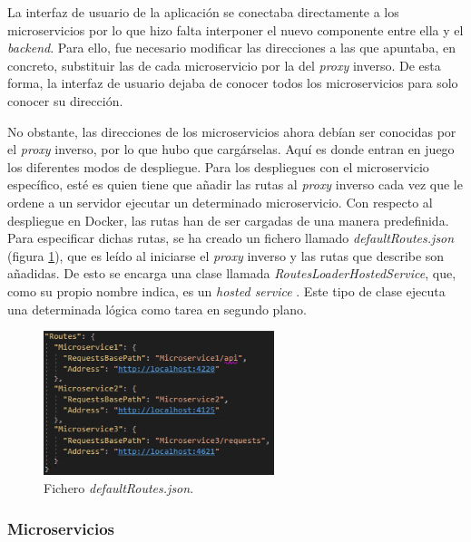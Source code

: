 \documentclass[11pt,spanish,listoffigures]{tfgetsinf}
\begin{document}
La interfaz de usuario de la aplicación se conectaba directamente a los microservicios por lo que hizo falta interponer el nuevo componente entre ella y el \emph{backend}. Para ello, fue necesario modificar las direcciones a las que apuntaba, en concreto, substituir las de cada microservicio por la del \emph{proxy} inverso. De esta forma, la interfaz de usuario dejaba de conocer todos los microservicios para solo conocer su dirección.

No obstante, las direcciones de los microservicios ahora debían ser conocidas por el \emph{proxy} inverso, por lo que hubo que cargárselas. Aquí es donde entran en juego los diferentes modos de despliegue. Para los despliegues con el microservicio específico, esté es quien tiene que añadir las rutas al \emph{proxy} inverso cada vez que le ordene a un servidor ejecutar un determinado microservicio. Con respecto al despliegue en Docker, las rutas han de ser cargadas de una manera predefinida. Para especificar dichas rutas, se ha creado un fichero llamado \emph{defaultRoutes.json} (figura \ref{defaultRoutes}), que es leído al iniciarse el \emph{proxy} inverso y las rutas que describe son añadidas. De esto se encarga una clase llamada \emph{RoutesLoaderHostedService}, que, como su propio nombre indica, es un \emph{hosted service} \cite{HostedServices}. Este tipo de clase ejecuta una determinada lógica como tarea en segundo plano.

\begin{figure}[ht]
\centering
\includegraphics[width=0.6\textwidth]{imagenes/defaultRoutes}
\caption{Fichero \emph{defaultRoutes.json}.}
	\label{defaultRoutes}
\end{figure}


			\subsubsection{Microservicios}
\end{document}
